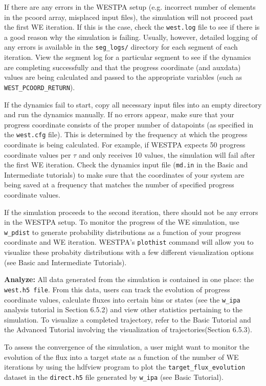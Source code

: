 \documentclass[9pt,tutorial,ASAPversion]{livecoms}
\begin{document}
If there are any errors in the WESTPA setup (e.g. incorrect number of elements in the pcoord array, misplaced input files), the simulation will not proceed past the first WE iteration. 
If this is the case, check the \verb|west.log| file to see if there is a good reason why the simulation is failing. 
Usually, however, detailed logging of any errors is available in the \verb|seg_logs/| directory for each segment of each iteration. 
View the segment log for a particular segment to see if the dynamics are completing successfully and that the progress coordinate (and auxdata) values are being calculated and passed to the appropriate variables (such as \verb|WEST_PCOORD_RETURN|).

If the dynamics fail to start, copy all necessary input files into an empty directory and run the dynamics manually. 
If no errors appear, make sure that your progress coordinate consists of the proper number of datapoints (as specified in the \verb|west.cfg| file). 
This is determined by the frequency at which the progress coordinate is being calculated. 
For example, if WESTPA expects 50 progress coordinate values per $\tau$ and only receives 10 values, the simulation will fail after the first WE iteration. 
Check the dynamics input file (\verb|md.in| in the Basic and Intermediate tutorials) to make sure that the coordinates of your system are being saved at a frequency that matches the number of specified progress coordinate values.

If the simulation proceeds to the second iteration, there should not be any errors in the WESTPA setup. 
To monitor the progress of the WE simulation, use \verb|w_pdist| to generate probability distributions as a function of your progress coordinate and WE iteration. 
WESTPA’s \verb|plothist| command will allow you to visualize these probabity distributions with a few different visualization options (see Basic and Intermediate Tutorials).

\textbf{Analyze:} All data generated from the simulation is contained in one place: the \verb|west.h5 file|. 
From this data, users can track the evolution of progress coordinate values, calculate fluxes into certain bins or states (see the \verb|w_ipa| analysis tutorial in Section 6.5.2) and view other statistics pertaining to the simulation. 
To visualize a completed trajectory, refer to the Basic Tutorial and the Advanced Tutorial involving the visualization of trajectories(Section 6.5.3).

To assess the convergence of the simulation, a user might want to monitor the evolution of the flux into a target state as a function of the number of WE iterations by using the hdfview program to plot the \verb|target_flux_evolution| dataset in the \verb|direct.h5| file generated by \verb|w_ipa| (see Basic Tutorial). 
\end{document}
